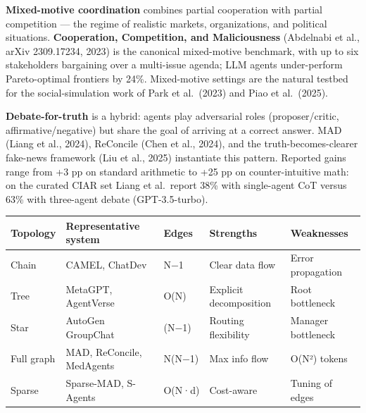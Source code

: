 \textbf{Mixed-motive coordination} combines partial cooperation with partial competition --- the regime of realistic markets, organizations, and political situations. \textbf{Cooperation, Competition, and Maliciousness} (Abdelnabi et al., arXiv 2309.17234, 2023) is the canonical mixed-motive benchmark, with up to six stakeholders bargaining over a multi-issue agenda; LLM agents under-perform Pareto-optimal frontiers by 24\%. Mixed-motive settings are the natural testbed for the social-simulation work of Park et al.~(2023) and Piao et al.~(2025).

\textbf{Debate-for-truth} is a hybrid: agents play adversarial roles (proposer/critic, affirmative/negative) but share the goal of arriving at a correct answer. MAD (Liang et al., 2024), ReConcile (Chen et al., 2024), and the truth-becomes-clearer fake-news framework (Liu et al., 2025) instantiate this pattern. Reported gains range from +3 pp on standard arithmetic to +25 pp on counter-intuitive math: on the curated CIAR set Liang et al.~report 38\% with single-agent CoT versus 63\% with three-agent debate (GPT-3.5-turbo).

{\def\LTcaptype{none} %
\begin{longtable}[]{@{}
  >{\raggedright\arraybackslash}p{}
  >{\raggedright\arraybackslash}p{}
  >{\raggedright\arraybackslash}p{}
  >{\raggedright\arraybackslash}p{}
  >{\raggedright\arraybackslash}p{}@{}}
\toprule\noalign{}
\begin{minipage}[b]{\linewidth}\raggedright
Topology
\end{minipage} & \begin{minipage}[b]{\linewidth}\raggedright
Representative system
\end{minipage} & \begin{minipage}[b]{\linewidth}\raggedright
Edges
\end{minipage} & \begin{minipage}[b]{\linewidth}\raggedright
Strengths
\end{minipage} & \begin{minipage}[b]{\linewidth}\raggedright
Weaknesses
\end{minipage} \\
\midrule\noalign{}
\endhead
\bottomrule\noalign{}
\endlastfoot
Chain & CAMEL, ChatDev & N−1 & Clear data flow & Error propagation \\
Tree & MetaGPT, AgentVerse & O(N) & Explicit decomposition & Root bottleneck \\
Star & AutoGen GroupChat & 2(N−1) & Routing flexibility & Manager bottleneck \\
Full graph & MAD, ReConcile, MedAgents & N(N−1) & Max info flow & O(N²) tokens \\
Sparse & Sparse-MAD, S-Agents & O(N·d) & Cost-aware & Tuning of edges \\
\end{longtable}
}

